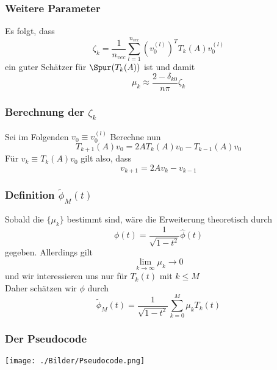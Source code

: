 \begin{frame}
    \frametitle{Weitere Parameter}
    Es folgt, dass
    $$\zeta_k = \frac{1}{n_{vec}} \sum_{l = 1}^{n_{vec}} \left( v_0^{(l)} \right)^T T_k(A) v_0^{(l)}$$
    ein guter Schätzer für $\Spur(T_k(A))$ ist und damit
    $$\mu_k \approx \frac{2 - \delta_{k0}}{n \pi} \zeta_k$$
\end{frame}

\begin{frame}
    \frametitle{Berechnung der $\zeta_k$}
    Sei im Folgenden $v_0 \equiv v_0^{(l)}$
    Berechne nun
    $$T_{k + 1}(A)v_0 = 2 A T_k(A) v_0 - T_{k - 1}(A) v_0$$
    Für $v_k \equiv T_k(A)v_0$ gilt also, dass
    $$v_{k + 1} = 2 A v_k - v_{k - 1}$$
\end{frame}

\begin{frame}
    \frametitle{Definition $\tilde{\phi}_M(t)$}
    Sobald die $\{ \mu_k \}$ bestimmt sind, wäre die Erweiterung theoretisch durch
    $$\phi(t) = \frac{1}{\sqrt{1 - t^2}} \hat{\phi}(t)$$
    gegeben. Allerdings gilt
    $$\lim \limits_{k \to \infty} \mu_k \to 0$$
    und wir interessieren uns nur für $T_k(t)$ mit $k \leq M$\\
    Daher schätzen wir $\phi$ durch
    $$\tilde{\phi}_M(t) = \frac{1}{\sqrt{1 - t^2}} \sum_{k = 0}^{M} \mu_k T_k(t)$$
\end{frame}

\begin{frame}
    \frametitle{Der Pseudocode}
    \texttt{[image: ./Bilder/Pseudocode.png]}
\end{frame}
